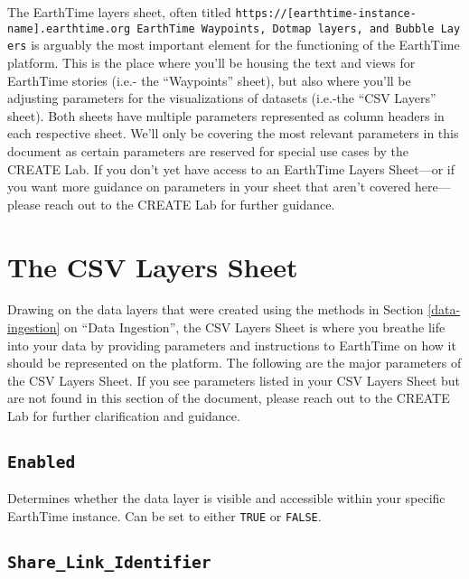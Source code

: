 \documentclass[
]{book}
\begin{document}
The EarthTime layers sheet, often titled \texttt{https://{[}earthtime-instance-name{]}.earthtime.org\ EarthTime\ Waypoints,\ Dotmap\ layers,\ and\ Bubble\ Layers} is arguably the most important element for the functioning of the EarthTime platform. This is the place where you'll be housing the text and views for EarthTime stories (i.e.- the ``Waypoints'' sheet), but also where you'll be adjusting parameters for the visualizations of datasets (i.e.-the ``CSV Layers'' sheet). Both sheets have multiple parameters represented as column headers in each respective sheet. We'll only be covering the most relevant parameters in this document as certain parameters are reserved for special use cases by the CREATE Lab. If you don't yet have access to an EarthTime Layers Sheet---or if you want more guidance on parameters in your sheet that aren't covered here---please reach out to the CREATE Lab for further guidance.

\hypertarget{the-csv-layers-sheet}{%
\section{The CSV Layers Sheet}\label{the-csv-layers-sheet}}

Drawing on the data layers that were created using the methods in Section \ref{data-ingestion} on ``Data Ingestion'', the CSV Layers Sheet is where you breathe life into your data by providing parameters and instructions to EarthTime on how it should be represented on the platform. The following are the major parameters of the CSV Layers Sheet. If you see parameters listed in your CSV Layers Sheet but are not found in this section of the document, please reach out to the CREATE Lab for further clarification and guidance.

\hypertarget{enabled}{%
\subsection*{\texorpdfstring{\texttt{Enabled}}{Enabled}}\label{enabled}}


Determines whether the data layer is visible and accessible within your specific EarthTime instance. Can be set to either \texttt{TRUE} or \texttt{FALSE}.

\hypertarget{share_link_identifier}{%
\subsection*{\texorpdfstring{\texttt{Share\_Link\_Identifier}}{Share\_Link\_Identifier}}\label{share_link_identifier}}
\end{document}
